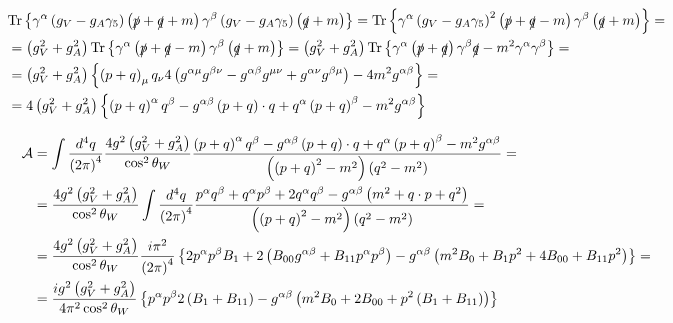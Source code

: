 \begin{align*}
& \mathrm{Tr} \left\lbrace \gamma^{\alpha} \left( g_V - g_A \gamma_5 \right) \left( \slashed{p}+\slashed{q}+m \right) \gamma^{\beta} \left( g_V - g_A \gamma_5 \right) \left( \slashed{q}+m \right) \right\rbrace = \mathrm{Tr} \left\lbrace \gamma^{\alpha} \left( g_V - g_A \gamma_5 \right)^2 \left( \slashed{p}+\slashed{q}-m \right) \gamma^{\beta} \left( \slashed{q}+m \right) \right\rbrace = & \\
& = \left( g_V^2 + g_A^2 \right) \mathrm{Tr} \left\lbrace \gamma^{\alpha} \left( \slashed{p} + \slashed{q} - m \right) \gamma^{\beta} \left( \slashed{q} + m \right) \right\rbrace = \left( g_V^2 + g_A^2 \right) \mathrm{Tr} \left\lbrace \gamma^{\alpha} \left( \slashed{p} + \slashed{q} \right) \gamma^{\beta} \slashed{q} - m^2 \gamma^{\alpha}\gamma^{\beta} \right\rbrace = & \\
& = \left( g_V^2 + g_A^2 \right) \left\lbrace \left( p+q \right)_{\mu} q_{\nu} 4 \left( g^{\alpha\mu}g^{\beta\nu} - g^{\alpha\beta}g^{\mu\nu} + g^{\alpha\nu}g^{\beta\mu} \right) - 4m^2 g^{\alpha\beta} \right\rbrace = & \\
& = 4 \left( g_V^2 + g_A^2 \right) \left\lbrace \left( p+q \right)^{\alpha}q^{\beta} - g^{\alpha\beta} \left( p+q \right) \cdot q + q^{\alpha} \left( p+q \right)^{\beta} - m^2 g^{\alpha\beta} \right\rbrace &
\end{align*}

\begin{align*}
\mathcal{A} & = \int \frac{d^4q}{\left( 2\pi \right)^4} \frac{4g^2\left(g_V^2 + g_A^2 \right)}{\cos^2\theta_W} \frac{\left( p+q \right)^{\alpha}q^{\beta} - g^{\alpha\beta} \left( p+q \right) \cdot q + q^{\alpha} \left( p+q \right)^{\beta} - m^2 g^{\alpha\beta}}{\left( \left( p+q \right)^2 -m^2 \right) \left( q^2 - m^2 \right)} = & \\
& = \frac{4g^2\left(g_V^2 + g_A^2 \right)}{\cos^2\theta_W} \int \frac{d^4q}{\left( 2\pi \right)^4} \frac{p^{\alpha}q^{\beta}+q^{\alpha}p^{\beta}+2q^{\alpha}q^{\beta} - g^{\alpha\beta} \left( m^2 + q \cdot p + q^2 \right)}{\left( \left( p+q \right)^2 -m^2 \right) \left( q^2 - m^2 \right)} = & \\
& = \frac{4g^2\left(g_V^2 + g_A^2 \right)}{\cos^2\theta_W} \frac{i\pi^2}{\left( 2\pi \right)^4} \left\lbrace 2 p^{\alpha}p^{\beta} B_1 + 2 \left( B_{00} g^{\alpha\beta} + B_{11} p^{\alpha}p^{\beta} \right) - g^{\alpha\beta} \left( m^2 B_0 + B_1 p^2 + 4 B_{00} + B_{11} p^2 \right) \right\rbrace = & \\
& = \frac{ig^2\left(g_V^2 + g_A^2 \right)}{4\pi^2\cos^2\theta_W} \left\lbrace p^{\alpha}p^{\beta} 2 \left( B_1 + B_{11} \right) - g^{\alpha\beta} \left( m^2 B_0 + 2 B_{00} + p^2 \left( B_1 + B_{11} \right) \right) \right\rbrace
\end{align*}

